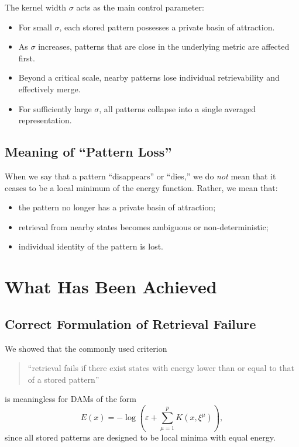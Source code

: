 \documentclass[11pt,a4paper]{article}
\begin{document}
The kernel width $\sigma$ acts as the main control parameter:
\begin{itemize}
    \item For small $\sigma$, each stored pattern possesses a private basin of attraction.
    \item As $\sigma$ increases, patterns that are close in the underlying metric are affected first.
    \item Beyond a critical scale, nearby patterns lose individual retrievability and effectively merge.
    \item For sufficiently large $\sigma$, all patterns collapse into a single averaged representation.
\end{itemize}

\subsection{Meaning of ``Pattern Loss''}

When we say that a pattern ``disappears'' or ``dies,'' we do \emph{not} mean that it ceases to be a local minimum of the energy function. Rather, we mean that:
\begin{itemize}
    \item the pattern no longer has a private basin of attraction;
    \item retrieval from nearby states becomes ambiguous or non-deterministic;
    \item individual identity of the pattern is lost.
\end{itemize}

\section{What Has Been Achieved}

\subsection{Correct Formulation of Retrieval Failure}

We showed that the commonly used criterion
\begin{quote}
``retrieval fails if there exist states with energy lower than or equal to that of a stored pattern''
\end{quote}
is meaningless for DAMs of the form
\[
E(x) = -\log\!\left(\varepsilon + \sum_{\mu=1}^p K(x,\xi^\mu)\right),
\]
since all stored patterns are designed to be local minima with equal energy.
\end{document}
